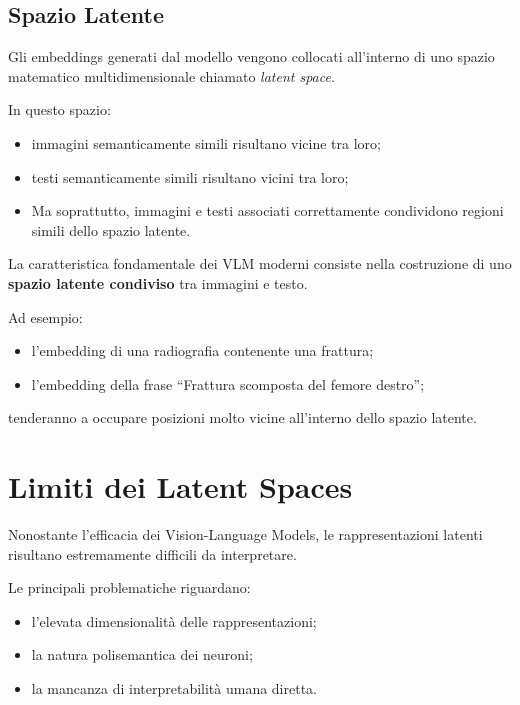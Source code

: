 \subsection{Spazio Latente}

Gli embeddings generati dal modello vengono collocati all'interno di uno spazio matematico multidimensionale chiamato \textit{latent space}.

In questo spazio:

\begin{itemize}
    \item immagini semanticamente simili risultano vicine tra loro;
    \item testi semanticamente simili risultano vicini tra loro;
    \item Ma soprattutto, immagini e testi associati correttamente condividono regioni simili dello spazio latente.
\end{itemize}

La caratteristica fondamentale dei VLM moderni consiste nella costruzione di uno \textbf{spazio latente condiviso} tra immagini e testo.

Ad esempio:

\begin{itemize}
    \item l'embedding di una radiografia contenente una frattura;
    \item l'embedding della frase ``Frattura scomposta del femore destro'';
\end{itemize}

tenderanno a occupare posizioni molto vicine all'interno dello spazio latente.

\section{Limiti dei Latent Spaces}

Nonostante l'efficacia dei Vision-Language Models, le rappresentazioni latenti risultano estremamente difficili da interpretare.

Le principali problematiche riguardano:

\begin{itemize}
    \item l'elevata dimensionalità delle rappresentazioni;
    \item la natura polisemantica dei neuroni;
    \item la mancanza di interpretabilità umana diretta.
\end{itemize}

